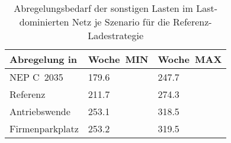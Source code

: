 {
\renewcommand{\arraystretch}{1.2}%
\begin{table}[H]
	\begin{center}
		\caption{Abregelungsbedarf der sonstigen Lasten im Last-dominierten Netz je Szenario für die Referenz-Ladestrategie}
		\begin{tabu} to 0.6\textwidth {X[1.5] X[1, r] X[1, r]}
			\toprule
			Abregelung in   \si{\mwh}    & Woche~MIN     & Woche~MAX     \\ \midrule
			NEP C~\num{2035}             & \num{179.6} & \num{247.7} \\
			Referenz                     & \num{211.7} & \num{274.3} \\
			Antriebswende                & \num{253.1} & \num{318.5} \\
			\glqq Firmenparkplatz\grqq{} & \num{253.2} & \num{319.5} \\ \bottomrule
		\end{tabu}
		\label{tab:load_dominated_load_cur}
	\end{center}
	\vspace{-3mm}%
\end{table}
}